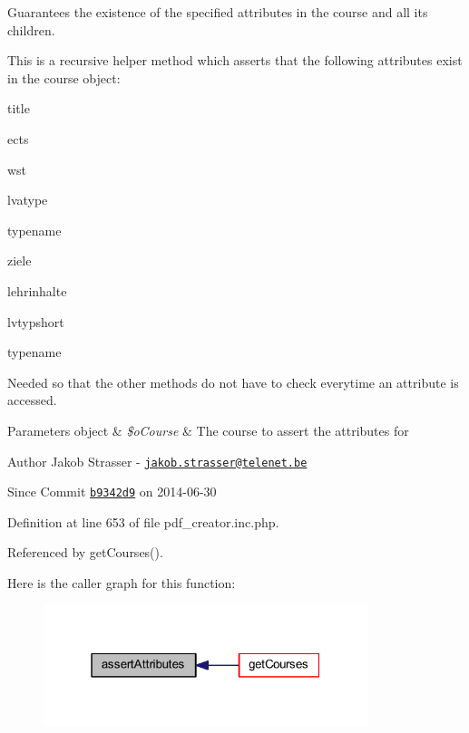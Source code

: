 Guarantees the existence of the specified attributes in the course and all its children. 

This is a recursive helper method which asserts that the following attributes exist in the course object\+:
\begin{DoxyItemize}
\item title
\item ects
\item wst
\item lvatype
\item typename
\item ziele
\item lehrinhalte
\item lvtypshort
\item typename
\end{DoxyItemize}

Needed so that the other methods do not have to check everytime an attribute is accessed.


\begin{DoxyParams}[1]{Parameters}
object & {\em \$o\+Course} & The course to assert the attributes for\\
\hline
\end{DoxyParams}
\begin{DoxyAuthor}{Author}
Jakob Strasser -\/ \href{mailto:jakob.strasser@telenet.be}{\tt jakob.\+strasser@telenet.\+be} 
\end{DoxyAuthor}
\begin{DoxySince}{Since}
Commit \href{http://github.com/TheJake123/DrupalModul/commit/b9342d941b3f93e212f3f6af0823a07524dd5954}{\tt b9342d9} on 2014-\/06-\/30 
\end{DoxySince}


Definition at line 653 of file pdf\+\_\+creator.\+inc.\+php.



Referenced by get\+Courses().



Here is the caller graph for this function\+:
\nopagebreak
\begin{figure}[H]
\begin{center}
\leavevmode
\includegraphics[width=268pt]{classoverview_p_d_f_a56f3ef341ae39bb7b4c34a700b33eac1_icgraph}
\end{center}
\end{figure}


